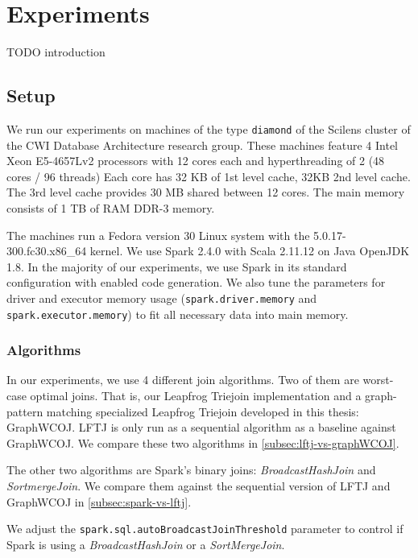 \section{Experiments}\label{sec:experiments}

TODO introduction

\subsection{Setup} \label{subsec:experimental-setup}

We run our experiments on machines of the type \texttt{diamond} of the Scilens cluster of the CWI Database Architecture research
group.
These machines feature 4 Intel Xeon E5-4657Lv2 processors with 12 cores each and hyperthreading of 2 (48 cores / 96 threads)
Each core has 32 KB of 1st level cache, 32KB 2nd level cache.
The 3rd level cache provides 30 MB shared between 12 cores.
The main memory consists of 1 TB of RAM DDR-3 memory.

The machines run a Fedora version 30 Linux system with the 5.0.17-300.fc30.x86\_64 kernel.
We use Spark 2.4.0 with Scala 2.11.12 on Java OpenJDK 1.8.
In the majority of our experiments, we use Spark in its standard configuration with enabled code generation.
We also tune the parameters for driver and executor memory usage (\texttt{spark.driver.memory} and \texttt{spark.executor.memory}) to fit
all necessary data into main memory.

\subsubsection{Algorithms}

In our experiments, we use 4 different join algorithms.
Two of them are worst-case optimal joins.
That is, our Leapfrog Triejoin implementation and a graph-pattern matching
specialized Leapfrog Triejoin developed in this thesis: Graph\textsc{WCOJ}.
LFTJ is only run as a sequential algorithm as a baseline against GraphWCOJ.
We compare these two algorithms in \cref{subsec:lftj-vs-graphWCOJ}.

The other two algorithms are Spark's binary joins: \textit{BroadcastHashJoin} and \textit{SortmergeJoin}.
We compare them against the sequential version of \textsc{LFTJ} and GraphWCOJ in \cref{subsec:spark-vs-lftj}.

We adjust the \texttt{spark.sql.autoBroadcastJoinThreshold} parameter to control
if Spark is using a \textit{BroadcastHashJoin} or a \textit{SortMergeJoin}.

